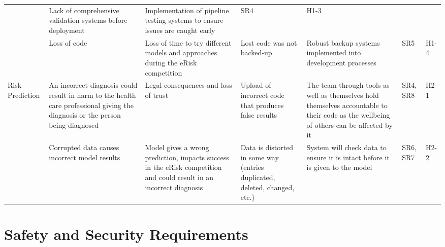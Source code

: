 \documentclass{article}
\begin{document}
\begin{landscape}
\begin{longtable}{|p{}|p{}|p{}|p{}|p{}|p{}|p{}|}
        & Lack of comprehensive validation systems before deployment
        & Implementation of pipeline testing systems to ensure issues are caught early
        & SR4
        & H1-3 \\
        \cline{2-7}
        \newpage \cline{2-7}
        & Loss of code
        & Loss of time to try different models and approaches during the eRisk competition
        & Lost code was not backed-up
        & Robust backup systems implemented into development processes
        & SR5
        & H1-4 \\
        \hline
        \multirow{2}{*}{Risk Prediction} 
        & An incorrect diagnosis could result in harm to the health care professional giving the diagnosis or the person being diagnosed
        & Legal consequences and loss of trust 
        & Upload of incorrect code that produces false results
        & The team through tools as well as themselves hold themselves accountable to their code as the wellbeing of others can be affected by it
        & SR4, SR8
        & H2-1 \\
        \cline{2-7}
        & Corrupted data causes incorrect model results
        & Model gives a wrong prediction, impacts success in the eRisk competition and could result in an incorrect diagnosis
        & Data is distorted in some way (entries duplicated, deleted, changed, etc.)
        & System will check data to ensure it is intact before it is given to the model
        & SR6, SR7
        & H2-2 \\
        \hline
    \end{longtable}
\end{landscape}


\section{Safety and Security Requirements}
\end{document}
